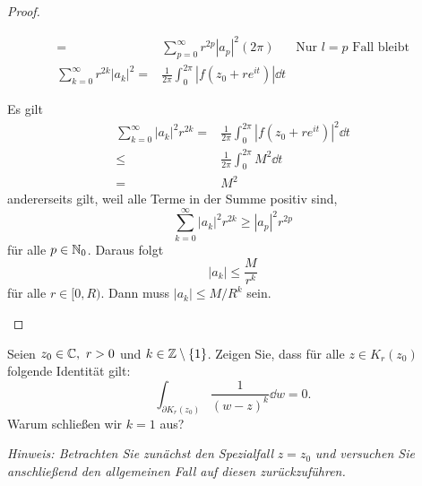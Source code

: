 \begin{proof}
\begin{parts}
\begin{align*}
			=&\sum_{p=0}^\infty r^{2p}|a_p|^2 (2\pi) &\text{Nur }l=p\text{ Fall bleibt}\\
\sum_{k=0}^\infty r^{2k} |a_k|^2=& 			\frac{1}{2\pi}\int_0^{2\pi} |f(z_0+re^{it})|\dd{t}
		\end{align*}
	\item Es gilt
		\begin{align*}
			\sum_{k=0}^\infty |a_k|^2 r^{2k}=& \frac{1}{2\pi}\int_0^{2\pi} |f(z_0+re^{it})|^2\dd{t}\\
			\le& \frac{1}{2\pi}\int_0^{2\pi} M^2\dd{t}\\
			=& M^2
		\end{align*}
		andererseits gilt, weil alle Terme in der Summe positiv sind,
		\[
		\sum_{k=0}^\infty |a_k|^2r^{2k} \ge |a_p|^2 r^{2p}
		\] 
		f\"{u}r alle $p\in \mathbb{N}_0$. Daraus folgt
		\[
		|a_k| \le \frac{M}{r^k}
		\]
		f\"{u}r alle $r\in [0,R)$. Dann muss $|a_k|\le M / R^k$ sein.\qedhere
	\end{parts}
\end{proof}
\begin{Problem}\label{pr:complexanal4-3}
	Seien $z_0\in \mathbb{C},~r>0$ und $k\in \mathbb{Z}\setminus \{1\} $. Zeigen Sie, dass f\"{u}r alle $z\in K_r(z_0)$ folgende Identität gilt:
	\[
		\int_{\partial K_r(z_0)}\frac{1}{(w-z)^k}\dd{w}=0
	.\] 
	Warum schließen wir $k=1$ aus?

	\emph{Hinweis: Betrachten Sie zunächst den Spezialfall} $z=z_0$ \emph{und versuchen Sie anschließend den allgemeinen Fall auf diesen zurückzuführen.}
\end{Problem}
